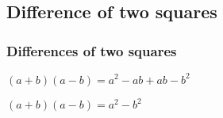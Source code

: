 \subsection{Difference of two squares}

\subsubsection{Differences of two squares}

\((a+b)(a-b)=a^2-ab+ab-b^2\)

\((a+b)(a-b)=a^2-b^2\)

